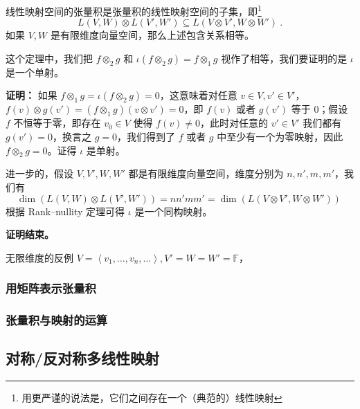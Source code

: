 \begin{theorem}{}
线性映射空间的张量积是张量积的线性映射空间的子集，即\footnote{用更严谨的说法是，它们之间存在一个（典范的）线性映射}
\begin{equation}
L(V, W) \otimes L(V', W') \subseteq L(V \otimes V', W \otimes W')~.
\end{equation}
如果 $V, W$ 是有限维度向量空间，那么上述包含关系相等。
\end{theorem}

这个定理中，我们把 $f \otimes_2 g$ 和 $\iota(f \otimes_2 g) = f \otimes_1 g$ 视作了相等，我们要证明的是 $\iota$ 是一个单射。

\textbf{证明：}
如果 $f \otimes_1 g = \iota(f \otimes_2 g) = 0$，这意味着对任意 $v \in V, v' \in V'$，$f(v) \otimes g(v') = (f \otimes_1 g)(v \otimes v') = 0$，即 $f(v)$ 或者 $g(v')$ 等于 $0$；假设 $f$ 不恒等于零，即存在 $v_0 \in V$ 使得 $f(v) \neq 0$，此时对任意的 $v' \in V'$ 我们都有 $g(v') = 0$，换言之 $g = 0$，我们得到了 $f$ 或者 $g$ 中至少有一个为零映射，因此 $f \otimes_2 g = 0$。证得 $\iota$ 是单射。

进一步的，假设 $V, V', W, W'$ 都是有限维度向量空间，维度分别为 $n, n', m, m'$，我们有
\begin{equation}
\dim(L(V, W) \otimes L(V', W')) = n n' m m' = \dim(L(V \otimes V', W \otimes W'))~
\end{equation}
根据 Rank–nullity 定理可得 $\iota$ 是一个同构映射。

\textbf{证明结束。}

\begin{example}{无限维度的反例}
$V = \left\langle v_1, \dots, v_n, \dots \right\rangle, V' = W = W' = \mathbb{F}$，
\end{example}

\subsubsection{用矩阵表示张量积}


\subsubsection{张量积与映射的运算}



\subsection{对称/反对称多线性映射}

